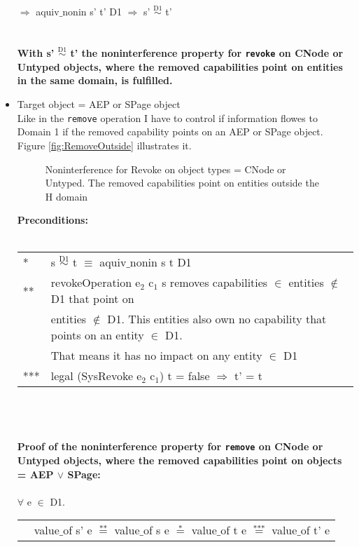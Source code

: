 \begin{itemize}
$\Rightarrow$ aquiv$\_$nonin s' t' D1 $\Rightarrow$ s' $\overset{\text{D1}}{\sim}$ t' \\ \\ \\
\textbf{With s' $\overset{\text{D1}}{\sim}$ t' the noninterference property for \texttt{revoke} on CNode or Untyped objects, where the removed capabilities point on entities in the same domain, is fulfilled.}  
\clearpage
\item Target object = AEP or SPage object \\
Like in the \texttt{remove} operation I have to control if information flowes to Domain 1 if the removed capability points on an AEP or SPage object. Figure \ref{fig:RemoveOutside} illustrates it. 
\begin{flushleft}
\begin{figure}[H]
\caption{Noninterference for Revoke on object types = CNode or Untyped. The removed capabilities point on entities outside the H domain}
\label{fig:RevokeOutside}
\end{figure}
\end{flushleft}
\textbf{Preconditions:} \\ \\
\begin{tabular}{ll}
* & s $\overset{\text{D1}}{\sim}$ t $\equiv$ aquiv$\_$nonin s t D1	\\ 
** & revokeOperation e$_2$ c$_1$ s removes capabilities $\in$ entities $\notin$ D1 that point on \\
& entities $\notin$ D1. This entities also own no capability that points on an entity $\in$ D1. \\
& That means it has no impact on any entity $\in$ D1 \\ 
*** & legal (SysRevoke e$_2$ c$_1$) t = false $\Rightarrow$ t' = t
\end{tabular} \\ \\ \\
\textbf{Proof of the noninterference property for \texttt{remove} on CNode or Untyped objects, where the removed capabilities point on objects = AEP $\vee$ SPage:}\\ \\
$\forall$ e $\in$ D1. \\
\begin{tabular}{ll}
& value$\_$of s' e $\overset{\text{**}}{=}$ value$\_$of s e $\overset{\text{*}}{=}$ value$\_$of t e $\overset{\text{***}}{=}$ value$\_$of t' e \\

\end{tabular}
\end{itemize}

